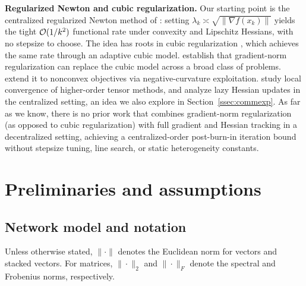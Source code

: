 \documentclass[review,onefignum,onetabnum]{siamart171218}
\begin{document}
	\noindent\textbf{Regularized Newton and cubic regularization.}
	Our starting point is the centralized regularized Newton method of
	\citet{mishchenko2023rn}: setting
	$\lambda_k\asymp\sqrt{\|\nabla f(x_k)\|}$ yields the tight
	$\mathcal{O}(1/k^2)$ functional rate under convexity and Lipschitz Hessians,
	with no stepsize to choose.
	The idea has roots in cubic regularization
	\citep{nesterov2006cubic,cartis2011arc}, which achieves the same rate
	through an adaptive cubic model.
	\citet{doikov2024gradient} establish that gradient-norm
	regularization can replace the cubic model across a broad class of
	problems.
	\citet{gratton2023nonconvex} extend it to nonconvex objectives via
	negative-curvature exploitation.
	\citet{doikov2022tensor} study local convergence of higher-order
	tensor methods, and \citet{doikov2023lazy} analyze lazy Hessian
	updates in the centralized setting, an idea we also explore in
	Section~\ref{ssec:commexp}.
	As far as we know, there is no prior work that combines gradient-norm
	regularization (as opposed to cubic regularization) with full
	gradient and Hessian tracking in a decentralized setting,
	achieving a centralized-order post-burn-in iteration bound without
	stepsize tuning, line search, or static heterogeneity constants.
	
	\section{Preliminaries and assumptions}\label{sec:prelim}
	\subsection{Network model and notation}
	Unless otherwise stated, $\|\cdot\|$ denotes the Euclidean norm for vectors
	and stacked vectors. For matrices, $\|\cdot\|_2$ and $\|\cdot\|_F$ denote
	the spectral and Frobenius norms, respectively.
	
\end{document}
